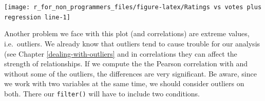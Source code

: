\documentclass[
]{book}
\newenvironment{Shaded}{\begin{snugshade}}{\end{snugshade}}
\newcommand{\CommentTok}[1]{\textcolor[rgb]{0.56,0.35,0.01}{\textit{#1}}}
\newcommand{\DocumentationTok}[1]{\textcolor[rgb]{0.56,0.35,0.01}{\textbf{\textit{#1}}}}
\newcommand{\FloatTok}[1]{\textcolor[rgb]{0.00,0.00,0.81}{#1}}
\newcommand{\FunctionTok}[1]{\textcolor[rgb]{0.00,0.00,0.00}{#1}}
\newcommand{\NormalTok}[1]{#1}
\newcommand{\OtherTok}[1]{\textcolor[rgb]{0.56,0.35,0.01}{#1}}
\newcommand{\SpecialCharTok}[1]{\textcolor[rgb]{0.00,0.00,0.00}{#1}}
\begin{document}
\begin{center}\texttt{[image: r\_for\_non\_programmers\_files/figure-latex/Ratings vs votes plus regression line-1]} \end{center}

Another problem we face with this plot (and correlations) are extreme values, i.e.~outliers. We already know that outliers tend to cause trouble for our analysis (see Chapter \ref{dealing-with-outliers} and in correlations they can affect the strength of relationships. If we compute the the Pearson correlation with and without some of the outliers, the differences are very significant. Be aware, since we work with two variables at the same time, we should consider outliers on both. There our \texttt{filter()} will have to include two conditions.

\begin{Shaded}
\end{Shaded}
\end{document}

